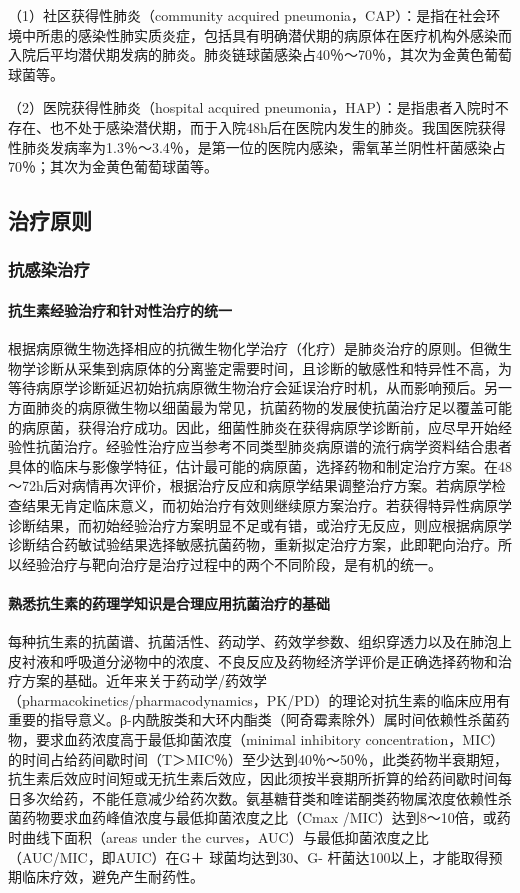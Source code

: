 （1）社区获得性肺炎（community acquired
pneumonia，CAP）：是指在社会环境中所患的感染性肺实质炎症，包括具有明确潜伏期的病原体在医疗机构外感染而入院后平均潜伏期发病的肺炎。肺炎链球菌感染占40％～70％，其次为金黄色葡萄球菌等。

（2）医院获得性肺炎（hospital acquired
pneumonia，HAP）：是指患者入院时不存在、也不处于感染潜伏期，而于入院48h后在医院内发生的肺炎。我国医院获得性肺炎发病率为1.3％～3.4％，是第一位的医院内感染，需氧革兰阴性杆菌感染占70％；其次为金黄色葡萄球菌等。

\subsection{治疗原则}

\subsubsection{抗感染治疗}
\paragraph{抗生素经验治疗和针对性治疗的统一}

根据病原微生物选择相应的抗微生物化学治疗（化疗）是肺炎治疗的原则。但微生物学诊断从采集到病原体的分离鉴定需要时间，且诊断的敏感性和特异性不高，为等待病原学诊断延迟初始抗病原微生物治疗会延误治疗时机，从而影响预后。另一方面肺炎的病原微生物以细菌最为常见，抗菌药物的发展使抗菌治疗足以覆盖可能的病原菌，获得治疗成功。因此，细菌性肺炎在获得病原学诊断前，应尽早开始经验性抗菌治疗。经验性治疗应当参考不同类型肺炎病原谱的流行病学资料结合患者具体的临床与影像学特征，估计最可能的病原菌，选择药物和制定治疗方案。在48～72h后对病情再次评价，根据治疗反应和病原学结果调整治疗方案。若病原学检查结果无肯定临床意义，而初始治疗有效则继续原方案治疗。若获得特异性病原学诊断结果，而初始经验治疗方案明显不足或有错，或治疗无反应，则应根据病原学诊断结合药敏试验结果选择敏感抗菌药物，重新拟定治疗方案，此即靶向治疗。所以经验治疗与靶向治疗是治疗过程中的两个不同阶段，是有机的统一。
\paragraph{熟悉抗生素的药理学知识是合理应用抗菌治疗的基础}

每种抗生素的抗菌谱、抗菌活性、药动学、药效学参数、组织穿透力以及在肺泡上皮衬液和呼吸道分泌物中的浓度、不良反应及药物经济学评价是正确选择药物和治疗方案的基础。近年来关于药动学/药效学（pharmacokinetics/pharmacodynamics，PK/PD）的理论对抗生素的临床应用有重要的指导意义。β-内酰胺类和大环内酯类（阿奇霉素除外）属时间依赖性杀菌药物，要求血药浓度高于最低抑菌浓度（minimal
inhibitory
concentration，MIC）的时间占给药间歇时间（T＞MIC％）至少达到40％～50％，此类药物半衰期短，抗生素后效应时间短或无抗生素后效应，因此须按半衰期所折算的给药间歇时间每日多次给药，不能任意减少给药次数。氨基糖苷类和喹诺酮类药物属浓度依赖性杀菌药物要求血药峰值浓度与最低抑菌浓度之比（C{max}
/MIC）达到8～10倍，或药时曲线下面积（areas under the
curves，AUC）与最低抑菌浓度之比（AUC/MIC，即AUIC）在G{＋}
球菌均达到30、G{-} 杆菌达100以上，才能取得预期临床疗效，避免产生耐药性。
